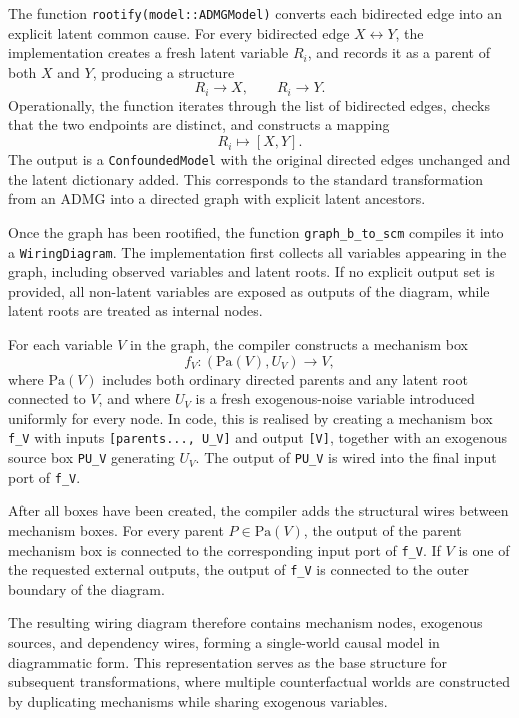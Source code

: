 \documentclass[a4paper]{report}
\begin{document}
The function \texttt{rootify(model::ADMGModel)} converts each bidirected edge into an explicit latent common cause. 
For every bidirected edge $X \leftrightarrow Y$, the implementation creates a fresh latent variable $R_i$, and records it as a parent of both $X$ and $Y$, producing a structure
\[
R_i \to X, \qquad R_i \to Y.
\]
Operationally, the function iterates through the list of bidirected edges, checks that the two endpoints are distinct, and constructs a mapping
\[
R_i \mapsto [X,Y].
\]
The output is a \texttt{ConfoundedModel} with the original directed edges unchanged and the latent dictionary added. 
This corresponds to the standard transformation from an ADMG into a directed graph with explicit latent ancestors.

Once the graph has been rootified, the function \texttt{graph\_b\_to\_scm} compiles it into a \texttt{WiringDiagram}. 
The implementation first collects all variables appearing in the graph, including observed variables and latent roots. 
If no explicit output set is provided, all non-latent variables are exposed as outputs of the diagram, while latent roots are treated as internal nodes.

For each variable $V$ in the graph, the compiler constructs a mechanism box
\[
f_V : (\mathrm{Pa}(V), U_V) \to V,
\]
where $\mathrm{Pa}(V)$ includes both ordinary directed parents and any latent root connected to $V$, and where $U_V$ is a fresh exogenous-noise variable introduced uniformly for every node. 
In code, this is realised by creating a mechanism box \texttt{f\_V} with inputs \texttt{[parents..., U\_V]} and output \texttt{[V]}, together with an exogenous source box \texttt{PU\_V} generating $U_V$. 
The output of \texttt{PU\_V} is wired into the final input port of \texttt{f\_V}.

After all boxes have been created, the compiler adds the structural wires between mechanism boxes. 
For every parent $P \in \mathrm{Pa}(V)$, the output of the parent mechanism box is connected to the corresponding input port of \texttt{f\_V}. 
If $V$ is one of the requested external outputs, the output of \texttt{f\_V} is connected to the outer boundary of the diagram.

The resulting wiring diagram therefore contains mechanism nodes, exogenous sources, and dependency wires, forming a single-world causal model in diagrammatic form. 
This representation serves as the base structure for subsequent transformations, where multiple counterfactual worlds are constructed by duplicating mechanisms while sharing exogenous variables.
\end{document}
